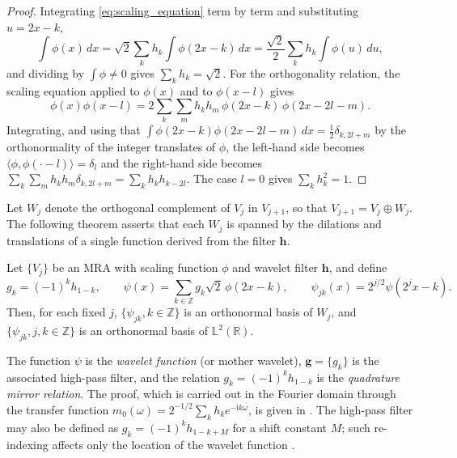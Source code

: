 \begin{proof}
Integrating \eqref{eq:scaling_equation} term by term and substituting
$u = 2x-k$,
\begin{equation*}
\int\phi(x)\,dx = \sqrt{2}\sum_kh_k\int\phi(2x-k)\,dx =
\frac{\sqrt{2}}{2}\sum_kh_k\int\phi(u)\,du,
\end{equation*}
and dividing by $\int\phi\neq 0$ gives $\sum_kh_k = \sqrt{2}$. For the
orthogonality relation, the scaling equation applied to $\phi(x)$ and to
$\phi(x-l)$ gives
\begin{equation*}
\phi(x)\phi(x-l) = 2\sum_k\sum_mh_kh_m\,\phi(2x-k)\,\phi(2x-2l-m).
\end{equation*}
Integrating, and using that $\int\phi(2x-k)\phi(2x-2l-m)\,dx =
\frac{1}{2}\delta_{k,2l+m}$ by the orthonormality of the integer
translates of $\phi$, the left-hand side becomes
$\langle\phi,\phi(\cdot-l)\rangle = \delta_l$ and the right-hand side
becomes $\sum_k\sum_mh_kh_m\delta_{k,2l+m} = \sum_kh_kh_{k-2l}$. The case
$l = 0$ gives $\sum_kh_k^2 = 1$.
\end{proof}

Let $W_j$ denote the orthogonal complement of $V_j$ in $V_{j+1}$, so that
$V_{j+1} = V_j\oplus W_j$. The following theorem asserts that each
$W_j$ is spanned by the dilations and translations of a single function
derived from the filter $\mathbf{h}$.

\begin{theorem}
\label{thm:wavelet_existence}
Let $\{V_j\}$ be an MRA with scaling function $\phi$ and wavelet filter
$\mathbf{h}$, and define
\begin{equation}
g_k = (-1)^kh_{1-k},\qquad
\psi(x) = \sum_{k\in\mathbb{Z}}g_k\sqrt{2}\,\phi(2x-k),\qquad
\psi_{jk}(x) = 2^{j/2}\psi(2^jx-k).
\label{eq:wavelet_def}
\end{equation}
Then, for each fixed $j$, $\{\psi_{jk}, k\in\mathbb{Z}\}$ is an orthonormal
basis of $W_j$, and $\{\psi_{jk}, j,k\in\mathbb{Z}\}$ is an orthonormal basis
of $\mathbb{L}^2(\mathbb{R})$.
\end{theorem}

The function $\psi$ is the \emph{wavelet function} (or mother wavelet),
$\mathbf{g} = \{g_k\}$ is the associated high-pass filter, and the relation
$g_k = (-1)^kh_{1-k}$ is the \emph{quadrature mirror relation}. The proof,
which is carried out in the Fourier domain through the transfer function
$m_0(\omega) = 2^{-1/2}\sum_kh_ke^{-\mathrm{i}k\omega}$, is given in
\cite[Sec.~3.3.1]{vidakovic1999}. The high-pass filter may also be defined as $g_k = (-1)^kh_{1-k+M}$ for a
shift constant $M$; such re-indexing affects only the location of the
wavelet function \cite[Remark~3.3.4]{vidakovic1999}.

